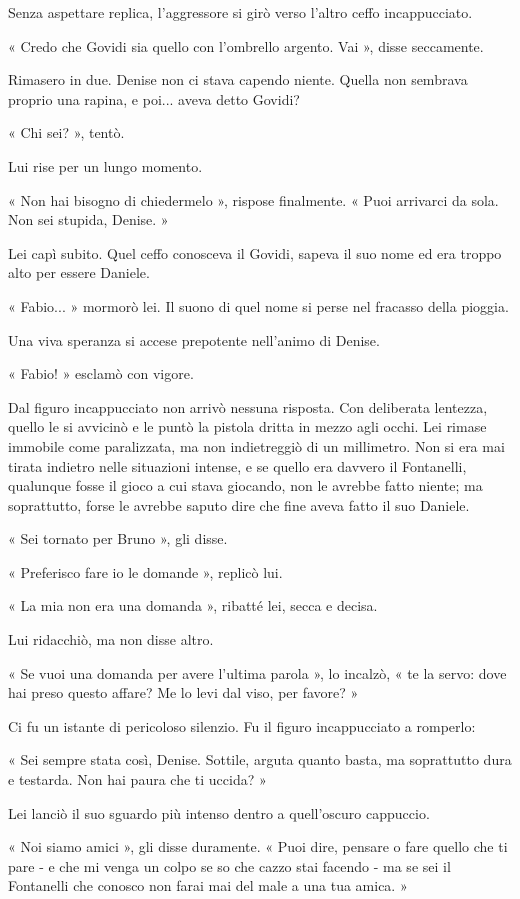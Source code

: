 Senza aspettare replica, l'aggressore si girò verso l'altro ceffo incappucciato.

« Credo che Govidi sia quello con l'ombrello argento. Vai », disse seccamente.

Rimasero in due. Denise non ci stava capendo niente. Quella non sembrava proprio una rapina, e poi... aveva detto Govidi?

« Chi sei? », tentò.

Lui rise per un lungo momento.

« Non hai bisogno di chiedermelo », rispose finalmente. « Puoi arrivarci da sola. Non sei stupida, Denise. »

Lei capì subito. Quel ceffo conosceva il Govidi, sapeva il suo nome ed era troppo alto per essere Daniele.

« Fabio... » mormorò lei. Il suono di quel nome si perse nel fracasso della pioggia.

Una viva speranza si accese prepotente nell'animo di Denise.

« Fabio! » esclamò con vigore.

Dal figuro incappucciato non arrivò nessuna risposta. Con deliberata lentezza, quello le si avvicinò e le puntò la pistola dritta in mezzo agli occhi. Lei rimase immobile come paralizzata, ma non indietreggiò di un millimetro. Non si era mai tirata indietro nelle situazioni intense, e se quello era davvero il Fontanelli, qualunque fosse il gioco a cui stava giocando, non le avrebbe fatto niente; ma soprattutto, forse le avrebbe saputo dire che fine aveva fatto il suo Daniele.

« Sei tornato per Bruno », gli disse.

« Preferisco fare io le domande », replicò lui.

« La mia non era una domanda », ribatté lei, secca e decisa.

Lui ridacchiò, ma non disse altro.

« Se vuoi una domanda per avere l'ultima parola », lo incalzò, « te la servo: dove hai preso questo affare? Me lo levi dal viso, per favore? »

Ci fu un istante di pericoloso silenzio. Fu il figuro incappucciato a romperlo:

« Sei sempre stata così, Denise. Sottile, arguta quanto basta, ma soprattutto dura e testarda. Non hai paura che ti uccida? »

Lei lanciò il suo sguardo più intenso dentro a quell'oscuro cappuccio.

« Noi siamo amici », gli disse duramente. « Puoi dire, pensare o fare quello che ti pare - e che mi venga un colpo se so che cazzo stai facendo - ma se sei il Fontanelli che conosco non farai mai del male a una tua amica. »

